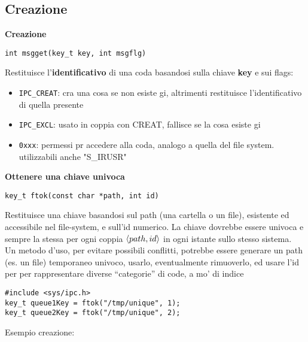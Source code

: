 \begin{flushleft}
  \subsection{Creazione}
  \begin{flushleft}
    \textbf{Creazione}\par 
    \begin{flushleft}
      \texttt{int msgget(key\_t key, int msgflg)}
    \end{flushleft}
    Restituisce l'\textbf{identificativo} di una coda basandosi sulla chiave \textbf{key} e sui flags:
    \begin{itemize}
      \item \texttt{IPC\_CREAT}: cra una cosa se non esiste gi\aca, altrimenti restituisce l'identificativo di quella presente
      \item \texttt{IPC\_EXCL}: usato in coppia con CREAT, fallisce se la cosa esiste gi\aca
      \item \texttt{0xxx}: permessi pr accedere alla coda, analogo a quella del file system. utilizzabili anche "S\_IRUSR"
    \end{itemize}
  \end{flushleft}
  \begin{flushleft}
    \textbf{Ottenere una chiave univoca}\par 
    \begin{flushleft}
      \texttt{key\_t ftok(const char *path, int id)}
    \end{flushleft}
    Restituisce una chiave basandosi sul path (una cartella o un file), esistente ed 
    accessibile nel file-system, e sull'id numerico. La chiave dovrebbe essere univoca e 
    sempre la stessa per ogni coppia \textbf{$\langle path,id \rangle$} in ogni istante sullo stesso sistema.\\
    Un metodo d'uso, per evitare possibili conflitti, potrebbe essere generare un path (es. 
    un file) temporaneo univoco, usarlo, eventualmente rimuoverlo, ed usare l'id per per 
    rappresentare diverse “categorie” di code, a mo' di indice
    \begin{flushleft}
      \texttt{\#include <sys/ipc.h> \\
              key\_t queue1Key = ftok("/tmp/unique", 1);\\
              key\_t queue2Key = ftok("/tmp/unique", 2);}
    \end{flushleft}
  \end{flushleft}
  \begin{flushleft}
    Esempio creazione:\par

\end{flushleft}
\end{flushleft}
